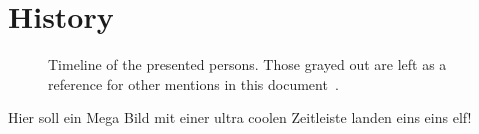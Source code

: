 \section{History}
\label{sec:History}

\begin{figure*}
    \caption[The Timeline]{Timeline of the presented persons. Those grayed out are left as a reference for other mentions in this document~\cite{wikimedia2021}.}
    \label{fig:timeline}
\end{figure*}

Hier soll ein Mega Bild mit einer ultra coolen Zeitleiste landen eins eins elf!